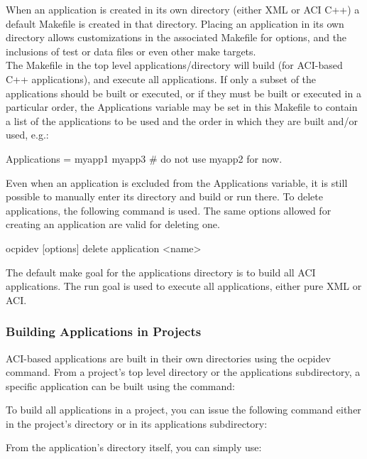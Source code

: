 \documentclass[10pt, a4paper, oneside]{article}
\renewcommand\_{\textunderscore\allowbreak} %
\begin{document}
When an application is created in its own directory (either XML or ACI C++) a default Makefile is created in that directory.  Placing an application in its own directory allows customizations in the associated Makefile for options, and the inclusions of test or data files or even other make targets.\\

The Makefile in the top level applications/directory will build (for ACI-based C++ applications), and execute all applications.  If only a subset of the applications should be built or executed, or if they must be built or executed in a particular order, the Applications variable may be set in this Makefile to contain a list of the applications to be used and the order in which they are built and/or used, e.g.:
\begin{ocpixml}
Applications = myapp1 myapp3 # do not use myapp2 for now. 
\end{ocpixml}

Even when an application is excluded from the Applications variable, it is still possible to manually enter its directory and build or run there. To delete applications, the following command is used.  The same options allowed for creating an application are valid for deleting one.
\begin{ocpixml}
ocpidev [options] delete application <name>
\end{ocpixml}
The default make goal for the applications directory is to build all ACI applications. The run goal is used to execute all applications, either pure XML or ACI.
\subsubsection{Building Applications in Projects} ACI-based applications are built in their own directories using the ocpidev command. From a project's top level directory or the applications subdirectory, a specific application can be built using the command: 
\begin{ocpixml}
\end{ocpixml}

To build all applications in a project, you can issue the following command either in the project's directory or in its applications subdirectory: \begin{ocpixml}
\end{ocpixml} 
From the application's directory itself, you can simply use:
\begin{ocpixml}
\end{ocpixml}
\end{document}
